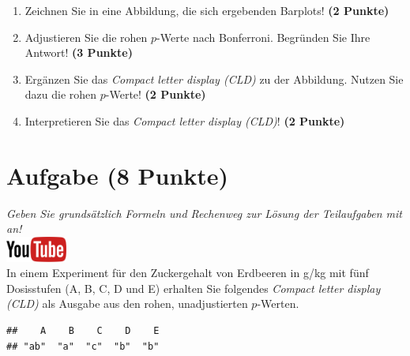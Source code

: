 \documentclass[a4paper, 9pt]{scrartcl}\usepackage[]{graphicx}\usepackage[]{xcolor}
\makeatletter
\newenvironment{kframe}{%
 \def\at@end@of@kframe{}%
 \ifinner\ifhmode%
  \def\at@end@of@kframe{\end{minipage}}%
  \begin{minipage}{\columnwidth}%
 \fi\fi%
 \def\FrameCommand##1{\hskip\@totalleftmargin \hskip-\fboxsep
 \colorbox{shadecolor}{##1}\hskip-\fboxsep
     \hskip-\linewidth \hskip-\@totalleftmargin \hskip\columnwidth}%
 \MakeFramed {\advance\hsize-\width
   \@totalleftmargin\z@ \linewidth\hsize
   \@setminipage}}%
 {\par\unskip\endMakeFramed%
 \at@end@of@kframe}
\newenvironment{knitrout}{}{} %
\makeatother
\begin{document}
\begin{enumerate}
\item Zeichnen Sie in eine Abbildung, die sich ergebenden Barplots! \textbf{(2 Punkte)}
\item Adjustieren Sie die rohen $p$-Werte nach Bonferroni. Begr{\"u}nden Sie Ihre Antwort! \textbf{(3 Punkte)}
\item Erg{\"a}nzen Sie das \textit{Compact letter display (CLD)} zu der
  Abbildung. Nutzen Sie dazu die rohen $p$-Werte! \textbf{(2 Punkte)}
\item Interpretieren Sie das \textit{Compact letter display (CLD)}! \textbf{(2 Punkte)} 
\end{enumerate}

 
\clearpage

\section{Aufgabe \hfill (8 Punkte)}

\textit{Geben Sie grunds{\"a}tzlich Formeln und Rechenweg zur L{\"o}sung der
  Teilaufgaben mit an!} \\[1Ex]

 \hfill\href{https://youtu.be/xq29O8qDrg0}{\includegraphics[width =
   2cm]{img/youtube}}\\[1Ex]


 
 In einem Experiment f{\"u}r den Zuckergehalt von Erdbeeren in g/kg mit f{\"u}nf
 Dosisstufen (A, B, C, D und E) erhalten Sie folgendes \textit{Compact
   letter display (CLD)} als \Rlogo Ausgabe aus den rohen, unadjustierten
 $p$-Werten.



\begin{knitrout}
\color{fgcolor}\begin{kframe}
\begin{verbatim}
##    A    B    C    D    E 
## "ab"  "a"  "c"  "b"  "b"
\end{verbatim}
\end{kframe}
\end{knitrout}
\end{document}
